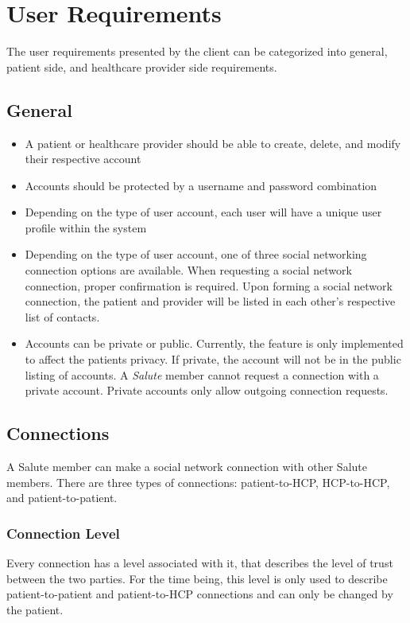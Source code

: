 \chapter{User Requirements}
The user requirements presented by the client can be categorized into general, patient side, and healthcare provider side requirements.

\section{General}
\begin{itemize}
\item A patient or healthcare provider should be able to create, delete, and modify their respective account
\item Accounts should be protected by a username and password combination
\item Depending on the type of user account, each user will have a unique user profile within the system
\item Depending on the type of user account, one of three social networking connection options are available. When requesting a social network connection, proper confirmation is required.  Upon forming a social network connection, the patient and provider will be listed in each other's respective list of contacts.
\item Accounts can be private or public. Currently, the feature is only implemented to affect the patients privacy. If private, the account will not be in the public listing of accounts. A \emph{Salute} member cannot request a connection with a private account. Private accounts only allow outgoing connection requests. 
\end{itemize} 

\section{Connections}
A Salute member can make a social network connection with other Salute members. There are three types of connections: patient-to-HCP, HCP-to-HCP, and patient-to-patient. 

\subsection{Connection Level}
Every connection has a level associated with it, that describes the level of trust between the two parties. For the time being, this level is only used to describe patient-to-patient and patient-to-HCP connections and can only be changed by the patient.

